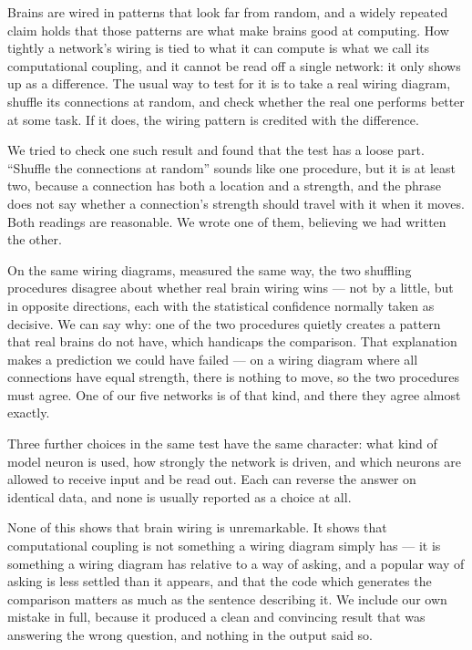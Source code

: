 \noindent
Brains are wired in patterns that look far from random, and a widely repeated claim holds
that those patterns are what make brains good at computing. How tightly a network's
wiring is tied to what it can compute is what we call its computational coupling, and it
cannot be read off a single network: it only shows up as a difference. The usual way to
test for it is to take a real wiring diagram, shuffle its connections at random, and check
whether the real one performs better at some task. If it does, the wiring pattern is
credited with the difference.

We tried to check one such result and found that the test has a loose part. ``Shuffle the
connections at random'' sounds like one procedure, but it is at least two, because a
connection has both a location and a strength, and the phrase does not say whether a
connection's strength should travel with it when it moves. Both readings are reasonable.
We wrote one of them, believing we had written the other.

On the same wiring diagrams, measured the same way, the two shuffling procedures disagree
about whether real brain wiring wins --- not by a little, but in opposite directions, each
with the statistical confidence normally taken as decisive. We can say why: one of the two
procedures quietly creates a pattern that real brains do not have, which handicaps the
comparison. That explanation makes a prediction we could have failed --- on a wiring
diagram where all connections have equal strength, there is nothing to move, so the two
procedures must agree. One of our five networks is of that kind, and there they agree
almost exactly.

Three further choices in the same test have the same character: what kind of model neuron
is used, how strongly the network is driven, and which neurons are allowed to receive
input and be read out. Each can reverse the answer on identical data, and none is usually
reported as a choice at all.

None of this shows that brain wiring is unremarkable. It shows that computational
coupling is not something a wiring diagram simply has --- it is something a wiring diagram
has relative to a way of asking, and a popular way of asking is less settled than it
appears, and that the code
which generates the comparison matters as much as the sentence describing it. We include
our own mistake in full, because it produced a clean and convincing result that was
answering the wrong question, and nothing in the output said so.
